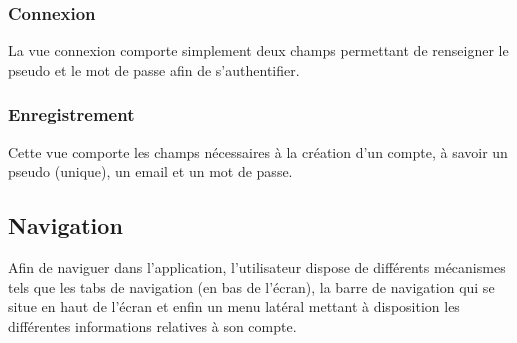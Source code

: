 \subsubsection{Connexion}
La vue connexion comporte simplement deux champs permettant de renseigner le pseudo et le mot de passe afin de s'authentifier.

\subsubsection{Enregistrement}
Cette vue comporte les champs nécessaires à la création d'un compte, à savoir un pseudo (unique), un email et un mot de passe.

\subsection{Navigation}
Afin de naviguer dans l'application, l'utilisateur dispose de différents mécanismes tels que les tabs de navigation (en bas de l'écran), la barre de navigation qui se situe en haut de l'écran et enfin un menu latéral mettant à disposition les différentes informations relatives à son compte.